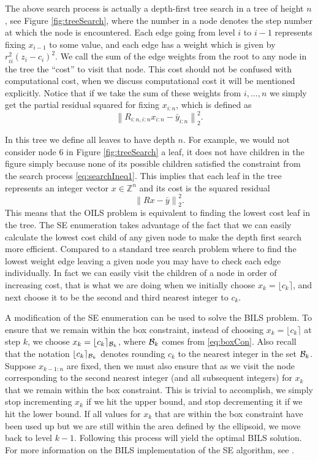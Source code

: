 \documentclass[12pt,Bold,letterpaper]{mcgilletdclass}
\begin{document}
The above search process is actually a depth-first tree search in a tree of height $n$, see Figure \ref{fig:treeSearch},
where the number in a node  denotes the step number at which the node is encountered. Each edge going from level $i$ to $i-1$ represents fixing $x_{i-1}$ to some value, and each edge has a weight which is given by $r_{ii}^2(z_i -
c_i)^2$. We call the sum of the edge weights from the root to any node in the tree the ``cost'' to visit that node. This cost should not be confused with computational cost, when we discuss computational cost it will be mentioned explicitly. Notice that if we take the sum of these weights from $i, \dots, n$ we simply get the partial
residual squared for fixing $x_{i:n}$, which is defined as $$\left \| R_{i:n,i:n}x_{i:n} -
\bar{y}_{i:n} \right \|_2^2.$$ 

In this tree we define all leaves to have depth $n$. For example, we would not consider node $6$ in Figure \ref{fig:treeSearch} a leaf, it does not have children in the figure simply because none of its possible children satisfied the constraint from the search process \eqref{eq:searchIneq1}. This implies that each leaf in the tree
represents an integer vector $x \in \mathbb{Z}^n$ and its cost is the squared residual $$\left \|
Rx - \bar{y} \right \|_2^2.$$ This means that the OILS problem is equivalent to
finding the lowest cost leaf in the tree. The SE enumeration takes advantage
of the fact that we can easily calculate the lowest cost child of any given
node to make the depth first search more efficient. Compared to a standard tree search problem where to find the lowest weight edge leaving a given node you may have to check each edge individually. In fact we can easily visit
the children of a node in order of increasing cost, that is what we are doing when we initially choose $x_k = \lfloor c_k \rceil$, and next choose it to be the second and third nearest integer to $c_k$.

A modification of the SE enumeration can be used to solve the BILS problem. To ensure that we remain within the box constraint, instead of choosing $x_k = \lfloor c_k \rceil$ at step $k$, we choose $x_{k} = \lfloor c_{k} \rceil_{{\cal B}_{k}}$, where ${\cal B}_{k}$ comes from \eqref{eq:boxCon}. Also recall that the notation $\lfloor c_{k} \rceil_{{\cal B}_{k}}$ denotes rounding $c_k$ to the nearest integer in the set ${\cal B}_{k}$. Suppose $x_{k-1:n}$ are fixed, then we must also ensure that as we visit the node corresponding to the second nearest integer (and all subsequent integers) for $x_k$ that we remain within the box constraint. This is trivial to accomplish, we simply stop incrementing $x_k$ if we hit the upper bound, and stop decrementing it if we hit the lower bound. If all values for $x_k$ that are within the box constraint have been used up but we are still within the area defined by the ellipsoid, we move back to level $k-1$. Following this process will yield the optimal BILS solution. For more information on the BILS implementation of the SE algorithm, see \cite{ChaH05}.
\end{document}
